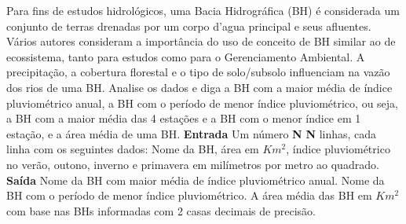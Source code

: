 \documentclass[a4paper, 12pt]{article}
\begin{document}
Para fins de estudos hidrológicos, uma Bacia Hidrográfica (BH) é considerada um conjunto de terras drenadas por um corpo d’agua principal e seus afluentes. Vários autores consideram a importância do uso de conceito de BH similar ao de ecossistema, tanto para estudos como para o Gerenciamento Ambiental. A precipitação, a cobertura florestal e o tipo de solo/subsolo influenciam na vazão dos rios de uma BH. Analise os dados e diga a BH com a maior média de índice pluviométrico anual, a BH com o período de menor índice pluviométrico, ou seja, a BH com a maior média das 4 estações e a BH com o menor índice em 1 estação, e a área média de uma BH.
\newline \newline
\textbf{{\large Entrada}} \newline
Um número \textbf{N} \newline
\textbf{N} linhas, cada linha com os seguintes dados:\newline
Nome da BH, área em $Km^2$, índice pluviométrico no verão, outono, inverno e primavera em milímetros por metro ao quadrado.
\newline \newline
\textbf{{\large Saída}} \newline
Nome da BH com maior média de índice pluviométrico anual.\newline
Nome da BH com o período de menor índice pluviométrico.\newline
A área média das BH em $Km^2$ com base nas BHs informadas com 2 casas decimais de precisão.
\newline \newline
\newline
\end{document}

